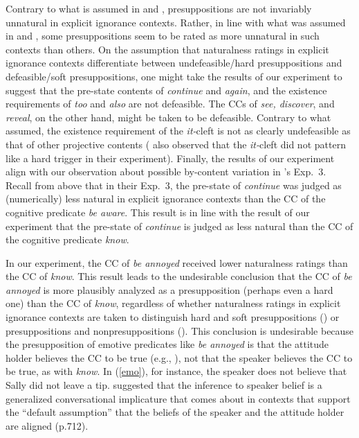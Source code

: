 \documentclass[11pt,fleqn]{article}
\newcommand{\6}{\mbox{$[\hspace*{-.6mm}[$}}
\newcommand{\9}{\mbox{$]\hspace*{-.6mm}]$}}
\newcommand{\citepos}[1]{\citeauthor{#1}'s \citeyear{#1}}
\begin{document}
Contrary to what is assumed in \citealt{mandelkern-etal2020} and \citealt{kalomoiros-schwarz2021,kalomoiros-schwarz-JoS}, presuppositions are not invariably unnatural in explicit ignorance contexts. Rather, in line with what was assumed in \citealt{simons01} and \citealt{abusch10}, some presuppositions seem to be rated as more unnatural in such contexts than others. On the assumption that naturalness ratings in explicit ignorance contexts differentiate between undefeasible/hard presuppositions and defeasible/soft presuppositions, one might take the results of our experiment to suggest that the pre-state contents of {\em continue} and {\em again}, and the existence requirements of {\em too} and {\em also} are not defeasible. The CCs of {\em see, discover}, and {\em reveal}, on the other hand, might be taken to be defeasible. Contrary to what \citealt{abusch10} assumed, the existence requirement of the {\em it-}cleft is not as clearly undefeasible as that of other projective contents (\citealt{smith-hall11} also observed that the {\em it-}cleft did not pattern like a hard trigger in their experiment). Finally, the results of our experiment align with our observation about possible by-content variation in \citepos{mandelkern-etal2020} Exp.~3. Recall from above that in their Exp.~3, the pre-state of {\em continue} was judged as (numerically) less natural in explicit ignorance contexts than the CC of the cognitive predicate {\em be aware}. This result is in line with the result of our experiment that the pre-state of {\em continue} is judged as less natural than the CC of the cognitive predicate {\em know}.

In our experiment, the CC of {\em be annoyed} received lower naturalness ratings than the CC of {\em know}. This result leads to the undesirable conclusion that the CC of {\em be annoyed} is more plausibly analyzed as a presupposition (perhaps even a hard one) than the CC of {\em know}, regardless of whether naturalness ratings in explicit ignorance contexts are taken to distinguish hard and soft presuppositions (\citealt{simons01,abusch10}) or presuppositions and nonpresuppositions (\citealt{mandelkern-etal2020,kalomoiros-schwarz2021,kalomoiros-schwarz-JoS}). This conclusion is undesirable because the presupposition of emotive predicates like {\em be annoyed} is that the attitude holder believes the CC to be true (e.g., \citealt{heim92,karttunen2016}), not that the speaker believes the CC to be true, as with {\em know}. In (\ref{emo}), for instance, the speaker does not believe that Sally did not leave a tip. \citealt{karttunen2016} suggested that the inference to speaker belief is a generalized conversational implicature that comes about in contexts that support the ``default assumption'' that the beliefs of the speaker and the attitude holder are aligned (p.712).
\end{document}
